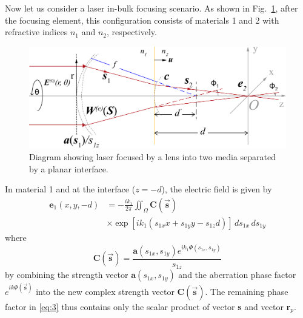 \documentclass[9pt,twocolumn,twoside]{osajnl}
\begin{document}
Now let us consider a laser in-bulk focusing scenario. As shown in Fig.~\ref{fig:1}, after the focusing element, this configuration consists of materials 1 and 2 with refractive indices $n_1$ and $n_2$, respectively.

\begin{figure}
	\centering
	\includegraphics[width=\linewidth]{../AppOptics/figures/vectorDiffractionTheory.pdf}
	\caption{Diagram showing laser focused by a lens into two media separated by a planar interface.}\label{fig:1}
\end{figure}

In material 1 and at the interface ($z=-d$), the electric field is given by
\begin{equation}\label{eq:3}
	\begin{aligned}
		\textbf{e}_1(x,y,-d)&=-\frac{ik_1}{2\pi}\iint_\Omega\textbf{C}(\vec{\mathbf{s}})\\
	&\times\exp[ik_1(s_{1x}x+s_{1y}y-s_{1z}d)]\,ds_{1x}\,ds_{1y}	
	\end{aligned}
\end{equation}
where 
\begin{equation}
	\textbf{C}(\vec{\mathbf{s}})=\frac{\textbf{a}(s_{1x},s_{1y})e^{ik_1\Phi(s_{1x},s_{1y})}}{s_{1z}}
\end{equation}\label{eq:4}
by combining the strength vector $\mathbf{a}(s_{1x},s_{1y})$ and the aberration phase factor $e^{ik\Phi(\vec{\mathbf{s}})}$ into the new complex strength vector $\textbf{C}(\vec{\mathbf{s}})$. The remaining phase factor in \eqref{eq:3} thus contains only the scalar product of vector \textbf{s} and vector \textbf{r}$_p$.
\end{document}

